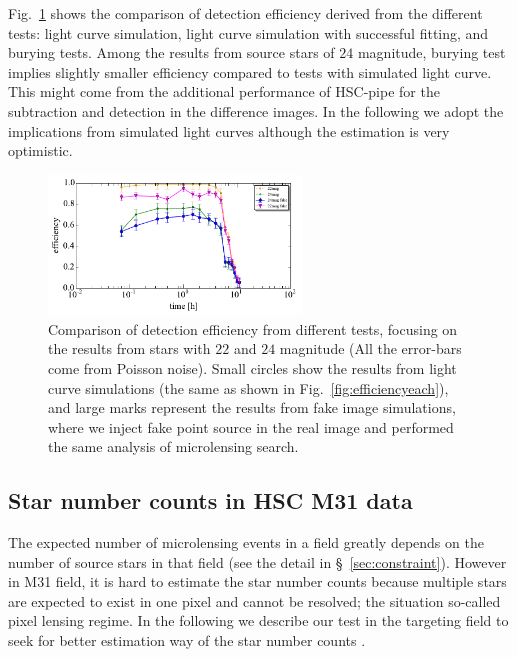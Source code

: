\documentclass[iop, apj]{emulateapj}
\newcommand{\?}{\stackrel{?}{=}}
\begin{document}
\begin{itemize}
\begin{itemize}
	Fig.~\ref{fig:ebury} shows the comparison of detection efficiency derived from the different tests: 
	light curve simulation, light curve simulation with successful fitting, and burying tests. 
	Among the results from source stars of $24$ magnitude, 
	burying test implies slightly smaller efficiency compared to tests with simulated light curve. 
	This might come from the additional performance of HSC-pipe for the subtraction and detection  
	in the difference images. 
	In the following we adopt the implications from simulated light curves %
	although the estimation is very optimistic. 
\begin{figure}
\centering
\includegraphics[width=0.6\textwidth]{pic/efficiency_fitting.pdf}
\caption{\small{ Comparison of detection efficiency from different tests, focusing on  the results from stars with $22$ and $24$ magnitude (All the error-bars come from Poisson noise).  Small circles show the results from light curve simulations (the same as shown in Fig.~\ref{fig:efficiencyeach}), and large marks represent the results from fake image simulations, where we inject fake point source in the real image and performed the same analysis of microlensing search. }}
\label{fig:ebury}
\end{figure}
%
\end{itemize}


\end{itemize}


\subsection{Star number counts in HSC M31 data}
\label{sec:snumber}
The expected number of microlensing events in a field greatly depends on the number of source stars in that field (see the detail in \S~\ref{sec:constraint}). However in M31 field, it is hard to estimate the star number counts because multiple stars are expected to exist in one pixel and cannot be resolved;  
the situation so-called pixel lensing regime. In the following we describe our test in the targeting field to seek for better estimation way of the star number counts . 
\end{document}
